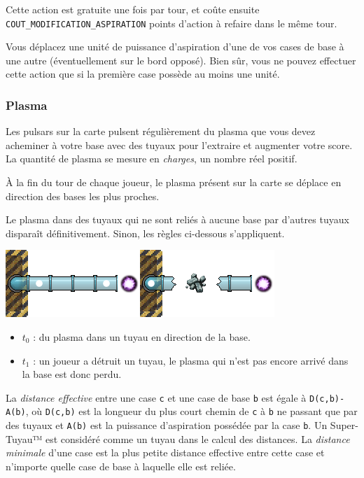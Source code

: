Cette action est gratuite une fois par tour, et coûte ensuite
\texttt{COUT\_MODIFICATION\_ASPIRATION} points d'action à refaire dans
le même tour.

Vous déplacez une unité de puissance d'aspiration d'une de vos cases de
base à une autre (éventuellement sur le bord opposé). Bien sûr, vous ne
pouvez effectuer cette action que si la première case possède au moins
une unité.

\subsubsection{Plasma}\label{plasma}

Les pulsars sur la carte pulsent régulièrement du plasma que vous devez
acheminer à votre base avec des tuyaux pour l'extraire et augmenter
votre score. La quantité de plasma se mesure en \emph{charges}, un
nombre réel positif.

À la fin du tour de chaque joueur, le plasma présent sur la carte se
déplace en direction des bases les plus proches.

Le plasma dans des tuyaux qui ne sont reliés à aucune base par d'autres
tuyaux disparaît définitivement. Sinon, les règles ci-dessous
s'appliquent.

\includegraphics{asset/debris_t0.png}\hfill\includegraphics{asset/debris_t1.png}

\begin{itemize}
\item $t_0$ : du plasma dans un tuyau en direction de la base.
\item $t_1$ : un joueur a détruit un tuyau, le plasma qui n'est pas encore arrivé
dans la base est donc perdu.
\end{itemize}

La \emph{distance effective} entre une case \texttt{c} et une case de
base \texttt{b} est égale à \texttt{D(c,b)-A(b)}, où \texttt{D(c,b)} est
la longueur du plus court chemin de \texttt{c} à \texttt{b} ne passant
que par des tuyaux et \texttt{A(b)} est la puissance d'aspiration
possédée par la case \texttt{b}. Un Super-Tuyau™ est considéré comme un
tuyau dans le calcul des distances. La \emph{distance minimale} d'une
case est la plus petite distance effective entre cette case et n'importe
quelle case de base à laquelle elle est reliée.

